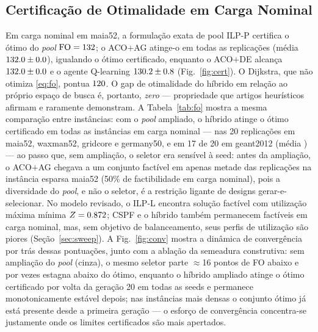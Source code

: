 \documentclass[journal]{IEEEtran}
\newcommand{\FO}{\mathrm{FO}}
\begin{document}
\subsection{Certificação de Otimalidade em Carga Nominal}
\label{sec:cert}
Em carga nominal em maia52, a formulação exata de pool ILP-P certifica o
ótimo do \emph{pool} $\FO=\PoolOptFO$; o ACO$+$AG atinge-o em todas as
replicações (média $132.0\pm0.0$), igualando o ótimo
certificado, enquanto o ACO$+$DE alcança $132.0\pm0.0$ e o agente
Q-learning $130.2\pm0.8$ (Fig.~\ref{fig:cert}). O Dijkstra, que
não otimiza \eqref{eq:fo}, pontua $120$. O gap de otimalidade do
híbrido em relação ao próprio espaço de busca é, portanto, \emph{zero} ---
propriedade que artigos heurísticos afirmam e raramente demonstram. A
Tabela~\ref{tab:fo} mostra a mesma comparação entre instâncias: com o
\emph{pool} ampliado, o híbrido atinge o ótimo certificado em todas as
instâncias em carga nominal --- nas 20 replicações em maia52, waxman52,
gridcore e germany50, e em 17 de 20 em geant2012 (média \AntGaFO) --- ao
passo que, sem ampliação, o seletor era sensível à seed: antes da ampliação,
o ACO$+$AG chegava a um conjunto factível em apenas metade das replicações
na instância esparsa maia52 (50\% de factibilidade em carga nominal), pois a
diversidade do \emph{pool}, e não o seletor, é a restrição ligante de
designs gerar-e-selecionar. No modelo
revisado, o ILP-L encontra solução factível com utilização máxima mínima
$Z=0.872$; CSPF e o híbrido também permanecem factíveis em carga
nominal, mas, sem objetivo de balanceamento, seus perfis de utilização são
piores (Seção~\ref{sec:sweep}).
A Fig.~\ref{fig:conv} mostra a dinâmica de convergência por trás dessas
pontuações, junto com a ablação da semeadura construtiva: sem ampliação do
\emph{pool} (cinza), o mesmo seletor parte $\approx$16 pontos de FO abaixo e
por vezes estagna abaixo do ótimo, enquanto o híbrido ampliado atinge o
ótimo certificado por volta da geração 20 em todas as seeds e permanece
monotonicamente estável depois; nas instâncias mais densas o conjunto ótimo
já está presente desde a primeira geração --- o esforço de convergência
concentra-se justamente onde os limites certificados são mais apertados.

\begin{table}[!t]
\caption{Pontuação da função objetivo em carga nominal (20 seeds, média
$\pm$ IC 95\%). Dijkstra e CSPF são determinísticos.}
\label{tab:fo}
\centering

\end{table}
\end{document}
